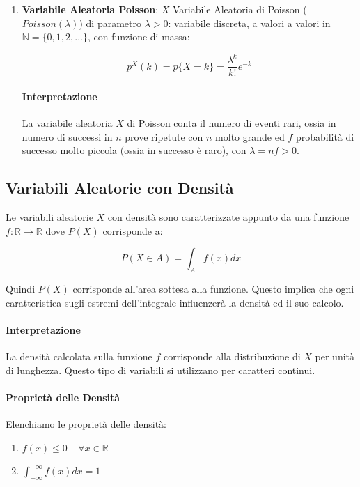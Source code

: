 \documentclass{article}
\begin{document}
\begin{enumerate}
\item \textbf{Variabile Aleatoria Poisson}: $X$ Variabile Aleatoria di Poisson ($Poisson(\lambda)$) di parametro $\lambda > 0$: variabile discreta, a valori
a valori in $\mathbb{N} = \{ 0,1,2, ... \}$, con funzione di massa:

\[ p^{X}(k) = p\{ X = k \} = \frac{\lambda^{k}}{k!}e^{-k} \]

\paragraph{Interpretazione} La variabile aleatoria $X$ di Poisson conta il numero di eventi rari, ossia in numero di successi in $n$ prove ripetute con $n$
molto grande ed $f$ probabilità di successo molto piccola (ossia in successo è raro), con $\lambda = nf > 0$.

\end{enumerate}

\subsection{Variabili Aleatorie con Densità}

Le variabili aleatorie $X$ con densità sono caratterizzate appunto da una funzione $f:\mathbb{R} \rightarrow \mathbb{R}$ dove $P(X)$ corrisponde a:

\[ P(X \in A) = \int_{A} f(x)dx \]

Quindi $P(X)$ corrisponde all'area sottesa alla funzione. Questo implica che ogni caratteristica sugli estremi dell'integrale influenzerà la densità ed il suo calcolo.

\paragraph{Interpretazione} La densità calcolata sulla funzione $f$ corrisponde alla distribuzione di $X$ per unità di lunghezza. Questo tipo di variabili si utilizzano per caratteri continui.

\newpage

\paragraph{Proprietà delle Densità} Elenchiamo le proprietà delle densità:

\begin{enumerate}
    \item $f(x) \leq 0 \:\:\:\:\: \forall x \in \mathbb{R} $
    \item $\int_{+\infty}^{-\infty} f(x)dx = 1$
\end{enumerate}
\end{document}
